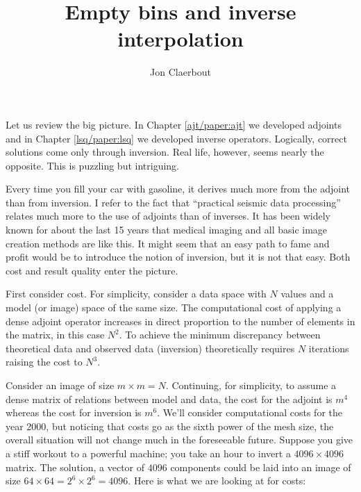 
\title{Empty bins and inverse interpolation}
\author{Jon Claerbout}
\maketitle

\label{paper:iin}
	

\par
Let us review the big picture.
In Chapter \ref{ajt/paper:ajt} we developed adjoints and
in Chapter \ref{lsq/paper:lsq} we developed inverse operators.
Logically, correct solutions come only through inversion.
Real life, however, seems nearly the opposite.
This is puzzling but intriguing.

\par
Every time you fill your car with gasoline,
it derives much more from the adjoint than from inversion.
I refer to the fact that ``practical seismic data processing''
relates much more to the use of adjoints than of inverses.
It has been widely known for about the last 15 years
that medical imaging and all basic image creation methods are like this.
It might seem that an easy path to fame and profit would
be to introduce the notion of inversion,
but it is not that easy.
Both cost and result quality enter the picture.

\par
First consider cost.
For simplicity, consider a data space with $N$ values
and a model (or image) space of the same size.
The computational cost of applying a dense adjoint
operator increases in direct proportion to the number
of elements in the matrix, in this case $N^2$.
To achieve the minimum discrepancy between theoretical data
and observed data (inversion) theoretically requires $N$ iterations
raising the cost to $N^3$.

\par
Consider an image of size $m\times m=N$.
Continuing, for simplicity, to assume a dense matrix of relations between
model and data,
the cost for the adjoint is $m^4$ whereas the cost for inversion is $m^6$.
We'll consider computational costs for the year 2000, but
noticing that costs go as the sixth power of the mesh size,
the overall situation will not change much in the foreseeable future.
Suppose you give a stiff workout to a powerful machine;
you take an hour to invert a $4096\times 4096$ matrix.
The solution, a vector of $4096$ components could
be laid into an image of size $64\times 64= 2^6\times 2^6 = 4096$.
Here is what we are looking at for costs:


